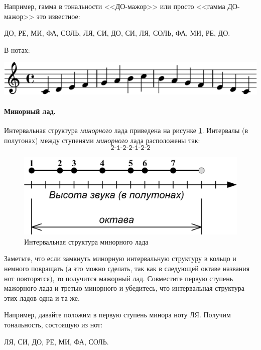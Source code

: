 Например, гамма в тональности <<ДО-мажор>> или просто <<гамма ДО-мажор>> это известное: 
\begin{center}
    ДО, РЕ, МИ, ФА, СОЛЬ, ЛЯ, СИ, ДО, СИ, ЛЯ, СОЛЬ, ФА, МИ, РЕ, ДО.
\end{center}

В нотах:
\begin{center}
    \includegraphics{fig/notes/scale-diat-c-maj}
\end{center}    


\paragraph{Минорный лад.} Интервальная структура \emph{минорного} лада приведена на рисунке \ref{fig:harmony:lad:mode:min}. Интервалы (в полутонах) между ступенями \emph{минорного} лада расположены так:
\[
    \texttt{2-1-2-2-1-2-2}
\]

\begin{figure}[!ht]
    \centering
    \includegraphics{fig/intervals/mode-min} 
    \caption{Интервальная структура минорного лада}\label{fig:harmony:lad:mode:min}
\end{figure} 

Заметьте, что если замкнуть минорную интервальную структуру в кольцо и немного повращать (а это можно сделать, так как в следующей октаве названия нот повторятся), то получится мажорный лад. Совместите первую ступень мажорного лада и третью минорного и убедитесь, что интервальная структура этих ладов одна и та же. 

Например, давайте положим в первую ступень минора ноту ЛЯ. Получим тональность, состоящую из нот:
\begin{center}
    ЛЯ, СИ, ДО, РЕ, МИ, ФА, СОЛЬ.
\end{center}

